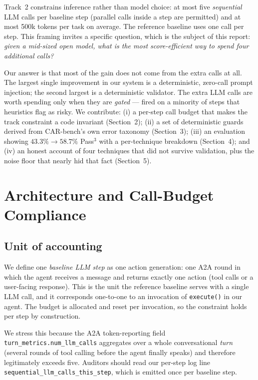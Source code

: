 \documentclass{article}
\begin{document}
Track~2 constrains inference rather than model choice: at most five
\emph{sequential} LLM calls per baseline step (parallel calls inside a
step are permitted) and at most 500k tokens per task on average. The
reference baseline uses one call per step. This framing invites a
specific question, which is the subject of this report: \emph{given a
mid-sized open model, what is the most score-efficient way to spend
four additional calls?}

Our answer is that most of the gain does not come from the extra calls
at all. The largest single improvement in our system is a
deterministic, zero-call prompt injection; the second largest is a
deterministic validator. The extra LLM calls are worth spending only
when they are \emph{gated} --- fired on a minority of steps that
heuristics flag as risky. We contribute: (i) a per-step call budget
that makes the track constraint a code invariant (Section~2);
(ii) a set of deterministic guards derived from CAR-bench's own error
taxonomy (Section~3); (iii) an evaluation showing $43.3\% \rightarrow
58.7\%$ Pass$^3$ with a per-technique breakdown (Section~4); and
(iv) an honest account of four techniques that did not survive
validation, plus the noise floor that nearly hid that fact
(Section~5).

\section{Architecture and Call-Budget Compliance}

\subsection{Unit of accounting}

We define one \emph{baseline LLM step} as one action generation: one
A2A round in which the agent receives a message and returns exactly one
action (tool calls or a user-facing response). This is the unit the
reference baseline serves with a single LLM call, and it corresponds
one-to-one to an invocation of \texttt{execute()} in our agent. The
budget is allocated and reset per invocation, so the constraint holds
per step by construction.

We stress this because the A2A token-reporting field
\texttt{turn\_metrics.num\_llm\_calls} aggregates over a whole
conversational \emph{turn} (several rounds of tool calling before the
agent finally speaks) and therefore legitimately exceeds five. Auditors
should read our per-step log line \texttt{sequential\_llm\_calls\_this\_step},
which is emitted once per baseline step.
\end{document}
